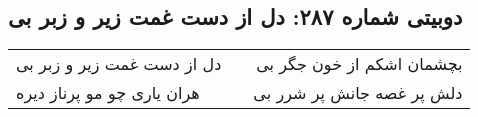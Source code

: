 \begin{center}
\section*{دوبیتی شماره ۲۸۷: دل از دست غمت زیر و زبر بی}
\label{sec:287}
\begin{longtable}{l p{0.5cm} r}
دل از دست غمت زیر و زبر بی
&&
بچشمان اشکم از خون جگر بی
\\
هران یاری چو مو پرناز دیره
&&
دلش پر غصه جانش پر شرر بی
\\
\end{longtable}
\end{center}
